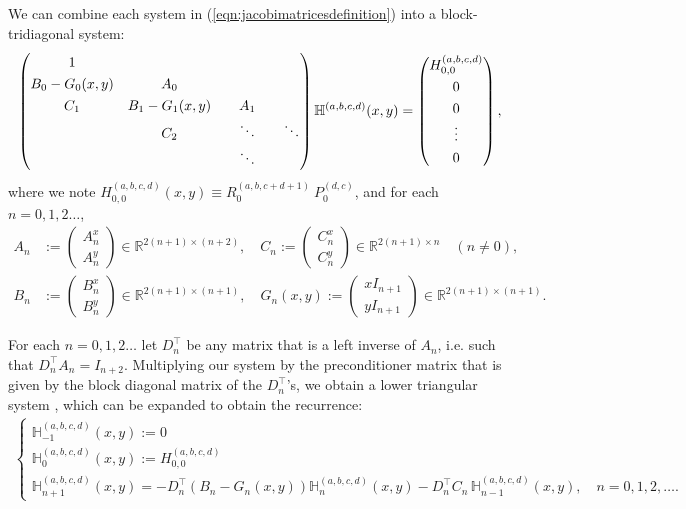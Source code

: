 \documentclass[11pt, oneside]{article}   	%
\newcommand{\R}{\mathbb{R}}
\newcommand{\hdop}{H}
\newcommand{\bighdop}{\mathbb{\hdop}}
\newcommand{\Dnt}{D^\top_n}
\newcommand{\jac}{{P}}
\newcommand{\genjac}{R}
\newcommand{\hdopabcd}{\hdop^{(a,b,c,d)}}
\newcommand{\bighdopabcd}{\bighdop^{(a,b,c,d)}}
\begin{document}
We can combine each system in (\ref{eqn:jacobimatricesdefinition}) into a block-tridiagonal system:
\begin{align*}
\renewcommand\arraystretch{1.3}
\begin{pmatrix}
		1 & & & \\
		B_0-G_0(x,y) & A_0 & & \\
		C_1 & B_1-G_1(x,y) & \quad A_1 \quad & \\
		& C_2 & \ddots & \ddots \\
		& & \ddots &
\end{pmatrix}
\bighdopabcd(x,y)
=
\begin{pmatrix}
	\hdopabcd_{0,0} \\ 0 \\ 0 \\ \vdots \\ 0 \\
\end{pmatrix},
\end{align*}
where we note $\hdopabcd_{0,0}(x,y) \equiv \genjac_0^{(a,b,c+d+1)} \: \jac_0^{(d,c)}$, and for each $n = 0,1,2\dots$,
\begin{align*}
A_n &:= \begin{pmatrix}
		A^x_n \\
		A^y_n
	    \end{pmatrix} \in \R^{2(n+1)\times(n+2)}, \quad
C_n := \begin{pmatrix}
		C^x_n \\
		C^y_n
	    \end{pmatrix} \in \R^{2(n+1)\times n} \quad (n \ne 0), \nonumber \\
B_n &:= \begin{pmatrix}
		B^x_n \\
		B^y_n
	    \end{pmatrix} \in \R^{2(n+1)\times(n+1)}, \quad
G_n(x,y) := \begin{pmatrix}
		xI_{n+1} \\
		yI_{n+1}
	    \end{pmatrix} \in \R^{2(n+1)\times(n+1)}.
\end{align*}
 
For each $n = 0,1,2\dots$ let $\Dnt$ be any matrix that is a left inverse of $A_n$, i.e. such that $\Dnt A_n = I_{n+2}$. Multiplying our system by the preconditioner matrix that is given by the block diagonal matrix of the $\Dnt$'s, we obtain a lower triangular system \cite[p78]{dunkl2014orthogonal}, which can be expanded to obtain the recurrence:
\begin{align*}
\begin{cases}
\bighdopabcd_{-1}(x,y) := 0 \\
\bighdopabcd_{0}(x,y) := \hdopabcd_{0,0} \\
\bighdopabcd_{n+1}(x,y) = -\Dnt (B_n-G_n(x,y)) \bighdopabcd_n(x,y) - \Dnt C_n  \,\bighdopabcd_{n-1}(x,y), \quad n = 0,1,2,\dots.
\end{cases}
\end{align*}
\end{document}
